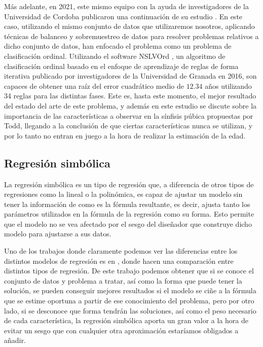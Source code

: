 Más adelante, en 2021, este mismo equipo con la ayuda de investigadores de la Universidad de Cordoba publicaron una continuación de su estudio \cite{NSLVOrdAge}. En este caso, utilizando el mismo conjunto de datos que utilizaremos nosotros, aplicando técnicas de balanceo y sobremuestreo de datos para resolver problemas relativos a dicho conjunto de datos, han enfocado el problema como un problema de clasificación ordinal. Utilizando el software NSLVOrd \cite{NSLVOrd}, un algoritmo de clasificación ordinal basado en el enfoque de aprendizaje de reglas de forma iterativa publicado por investigadores de la Universidad de Granada en 2016, son capaces de obtener una raíz del error cuadrático medio de $12.34$ años utilizando 34 reglas para las distintas fases. Este es, hasta este momento, el mejor resultado del estado del arte de este problema, y además en este estudio se discute sobre la importancia de las características a observar en la sínfisis púbica propuestas por Todd, llegando a la conclusión de que ciertas características nunca se utilizan, y por lo tanto no entran en juego a la hora de realizar la estimación de la edad.


\subsection{Regresión simbólica}

La regresión simbólica es un tipo de regresión que, a diferencia de otros tipos de regresiones como la lineal o la polinómica, es capaz de ajustar un modelo sin tener la información de como es la fórmula resultante, es decir, ajusta tanto los parámetros utilizados en la fórmula de la regresión como su forma. Esto permite que el modelo no se vea afectado por el sesgo del diseñador que construye dicho modelo para ajustarse a sus datos.

Uno de los trabajos donde claramente podemos ver las diferencias entre los distintos modelos de regresión es en \cite{analisisRegresionSimbolica}, donde hacen una comparación entre distintos tipos de regresión. De este trabajo podemos obtener que si se conoce el conjunto de datos y problema a tratar, así como la forma que puede tener la solución, se pueden conseguir mejores resultados si el modelo se ciñe a la fórmula que se estime oportuna a partir de ese conocimiento del problema, pero por otro lado, si se desconoce que forma tendrán las soluciones, así como el peso necesario de cada característica, la regresión simbólica aporta un gran valor a la hora de evitar un sesgo que con cualquier otra aproximación estaríamos obligados a añadir.

